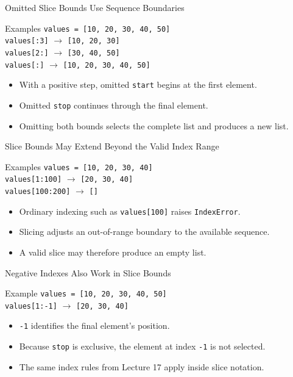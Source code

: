 \documentclass[aspectratio=169,10pt]{beamer}
\begin{document}
\begin{frame}{Omitted Slice Bounds Use Sequence Boundaries}
  \begin{block}{Examples}
    \texttt{values = [10, 20, 30, 40, 50]}\\[0.08in]
    \texttt{values[:3]} $\longrightarrow$ \texttt{[10, 20, 30]}\\
    \texttt{values[2:]} $\longrightarrow$ \texttt{[30, 40, 50]}\\
    \texttt{values[:]} $\longrightarrow$ \texttt{[10, 20, 30, 40, 50]}
  \end{block}

  \begin{itemize}
    \item With a positive step, omitted \texttt{start} begins at the first element.
    \item Omitted \texttt{stop} continues through the final element.
    \item Omitting both bounds selects the complete list and produces a new list.
  \end{itemize}
\end{frame}

\begin{frame}{Slice Bounds May Extend Beyond the Valid Index Range}
  \begin{block}{Examples}
    \texttt{values = [10, 20, 30, 40]}\\[0.08in]
    \texttt{values[1:100]} $\longrightarrow$ \texttt{[20, 30, 40]}\\
    \texttt{values[100:200]} $\longrightarrow$ \texttt{[]}
  \end{block}

  \begin{itemize}
    \item Ordinary indexing such as \texttt{values[100]} raises \texttt{IndexError}.
    \item Slicing adjusts an out-of-range boundary to the available sequence.
    \item A valid slice may therefore produce an empty list.
  \end{itemize}
\end{frame}

\begin{frame}{Negative Indexes Also Work in Slice Bounds}
  \begin{block}{Example}
    \texttt{values = [10, 20, 30, 40, 50]}\\[0.10in]
    \texttt{values[1:-1]} $\longrightarrow$ \texttt{[20, 30, 40]}
  \end{block}

  \begin{itemize}
    \item \texttt{-1} identifies the final element's position.
    \item Because \texttt{stop} is exclusive, the element at index \texttt{-1} is not selected.
    \item The same index rules from Lecture 17 apply inside slice notation.
  \end{itemize}
\end{frame}
\end{document}

